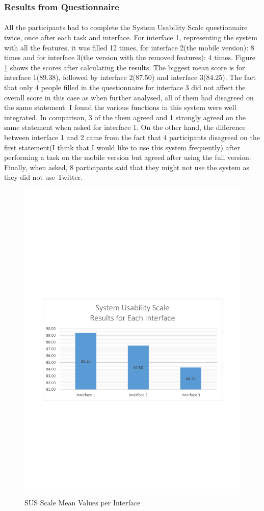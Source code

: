\documentclass{l4proj}
\begin{document}
{\subsubsection{Results from Questionnaire}
\paragraph{}
All the participants had to complete the System Usability Scale questionnaire twice, once after each task and interface. For interface 1, representing the system with all the features, it was filled 12 times, for interface 2(the mobile version): 8 times and for interface 3(the version with the removed features): 4 times. Figure \ref{fig:susresultsmean} shows the scores after calculating the results. The biggest mean score is for interface 1(89.38), followed by interface 2(87.50) and interface 3(84.25). The fact that only 4 people filled in the questionnaire for interface 3 did not affect the overall score in this case as when further analysed, all of them had disagreed on the same statement: I found the various functions in this system were well integrated. In comparison, 3 of the them agreed and 1 strongly agreed on the same statement when asked for interface 1. On the other hand, the difference between interface 1 and 2 came from the fact that 4 participants disagreed on the first statement(I think that I would like to use this system frequently) after performing a task on the mobile version but agreed after using the full version. Finally, when asked, 8 participants said that they might not use the system as they did not use Twitter.

\begin{figure}[H]
	\centering
	\includegraphics[width=.6\textwidth]{charts/SUSScaleMeanValues.pdf}
	\caption{SUS Scale Mean Values per Interface}
	\label{fig:susresultsmean}
\end{figure}

}
\end{document}
